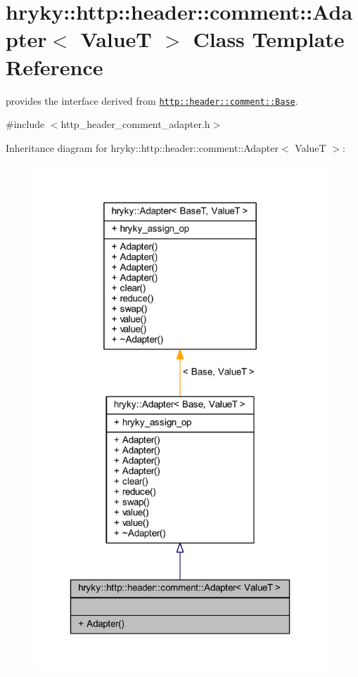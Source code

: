 \hypertarget{classhryky_1_1http_1_1header_1_1comment_1_1_adapter}{\section{hryky\-:\-:http\-:\-:header\-:\-:comment\-:\-:Adapter$<$ Value\-T $>$ Class Template Reference}
\label{classhryky_1_1http_1_1header_1_1comment_1_1_adapter}
}


provides the interface derived from \href{http::header::comment::Base}{\tt http\-::header\-::comment\-::\-Base}.  




{\ttfamily \#include $<$http\-\_\-header\-\_\-comment\-\_\-adapter.\-h$>$}



Inheritance diagram for hryky\-:\-:http\-:\-:header\-:\-:comment\-:\-:Adapter$<$ Value\-T $>$\-:
\nopagebreak
\begin{figure}[H]
\begin{center}
\leavevmode
\includegraphics[width=312pt]{classhryky_1_1http_1_1header_1_1comment_1_1_adapter__inherit__graph}
\end{center}
\end{figure}
